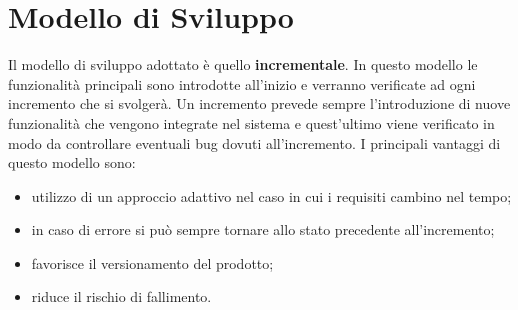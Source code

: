 \section{Modello di Sviluppo}
Il modello di sviluppo adottato è quello \textbf{incrementale}. In questo
modello le funzionalità principali sono introdotte all'inizio e verranno verificate 
ad ogni incremento che si svolgerà. Un incremento prevede sempre l'introduzione di nuove
funzionalità che vengono integrate nel sistema e quest'ultimo viene verificato in modo da
controllare eventuali bug dovuti all'incremento. I principali vantaggi di questo modello sono:
\begin{itemize}
    \item utilizzo di un approccio adattivo nel caso in cui i requisiti cambino nel tempo;
    \item in caso di errore si può sempre tornare allo stato precedente all'incremento;
    \item favorisce il versionamento del prodotto;
    \item riduce il rischio di fallimento.
\end{itemize}